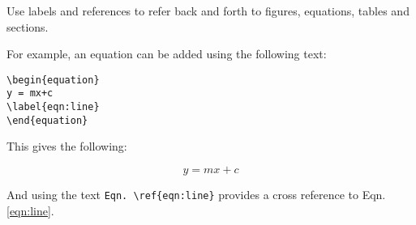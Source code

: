Use labels and references to refer back and forth to figures, equations, tables and sections. 

For example, an equation can be added using the following text:

\begin{lstlisting}[language={[LaTeX]Tex}]
\begin{equation}
y = mx+c
\label{eqn:line}
\end{equation}
\end{lstlisting}

This gives the following:

\begin{equation}
y = mx+c
\label{eqn:line}
\end{equation}

And using the text \verb+Eqn. \ref{eqn:line}+ provides a cross reference to Eqn. \ref{eqn:line}.